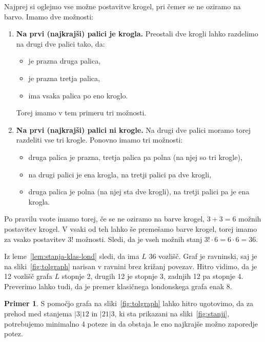 \documentclass[12pt,a4paper]{amsart}
\theoremstyle{definition} %
\newtheorem{primer}[definicija]{Primer}
\theoremstyle{plain} %
\begin{document}
\proof
    Najprej si oglejmo vse možne postavitve krogel, pri čemer se ne oziramo na barvo.
    Imamo dve možnosti:
    \begin{enumerate}
        \item \textbf{Na prvi (najkrajši) palici je krogla.}
        Preostali dve krogli lahko razdelimo na drugi dve palici tako, da:
        \begin{itemize}[label={--}]
            \item je prazna druga palica,
            \item je prazna tretja palica,
            \item ima vsaka palica po eno kroglo.
        \end{itemize}
        Torej imamo v tem primeru tri možnosti.
        
        \item \textbf{Na prvi (najkrajši) palici ni krogle.}
        Na drugi dve palici moramo torej razdeliti vse tri krogle.
        Ponovno imamo tri možnosti:
        \begin{itemize}[label={--}]
            \item druga palica je prazna, tretja palica pa polna (na njej so tri krogle),
            \item na drugi palici je ena krogla, na tretji palici pa dve krogli,
            \item druga palica je polna (na njej sta dve krogli), na tretji palici pa je ena krogla.
        \end{itemize}
    \end{enumerate}
    Po pravilu vsote imamo torej, če se ne oziramo na barve krogel, $3+3=6$ možnih postavitev krogel.
    V vsaki od teh lahko še premešamo barve krogel, torej imamo za vsako postavitev $3!$ možnosti. Sledi, da je vseh možnih stanj $3! \cdot 6 = 6 \cdot 6 = 36$.\qedhere
\endproof

Iz leme~\ref{lem:stanja-klas-lond} sledi, da ima $L$ 36 vozlišč. Graf je ravninski, saj je na sliki~\ref{fig:tolgraph} narisan v ravnini brez križanj povezav. Hitro vidimo, da je 12 vozlišč grafa $L$ stopnje 2, drugih 12 je stopnje 3, zadnjih 12 pa stopnje 4. Preverimo lahko tudi, da je premer klasičnega londonskega grafa enak 8.

\begin{primer}
    S pomočjo grafa na sliki~\ref{fig:tolgraph} lahko hitro ugotovimo, da za prehod med stanjema $|3|12$ in $|21|3$, ki sta prikazani na sliki~\ref{fig:stanji}, potrebujemo minimalno 4 poteze in da obstaja le eno najkrajše možno zaporedje potez.
\end{primer}
\end{document}
